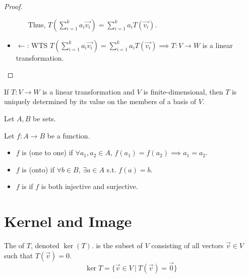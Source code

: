 \documentclass[11pt,fleqn]{book} %
\begin{document}
\begin{proof}
\begin{itemize}
\begin{itemize}
        Thus, $\displaystyle T(\sum_{i=1}^ka_i\overrightarrow{v_i})=\sum_{i=1}^ka_iT(\overrightarrow{v_i})$. 
        \end{itemize}
        
        \item $\leftarrow$: WTS $\displaystyle T(\sum_{i=1}^ka_i\overrightarrow{v_i})=\sum_{i=1}^ka_iT(\overrightarrow{v_i}) \implies T: V \to W$ is a linear transformation. 
    \end{itemize}
\end{proof}

\setcounter{dummy}{13}
\begin{proposition}
    If $T: V \to W$ is a linear transformation and $V$ is finite-dimensional, then $T$ is uniquely determined by its value on the members of a basis of $V$. 
\end{proposition}

\setcounter{section}{0}
\begin{definition}
    Let $A, B$ be sets. 

    Let $f: A \to B$ be a function. 

    \begin{itemize}
        \item $f$ is  (one to one) if $\forall a_1, a_2 \in A$, $f(a_1) = f(a_2) \implies a_1 = a_2$. 

        \item $f$ is  (onto) if $\forall b \in B$, $\exists a \in A$ s.t. $f(a) = b$. 

        \item $f$ is  if $f$ is both injective and surjective. 
    \end{itemize}
\end{definition}
\setcounter{section}{1}

\section{Kernel and Image}

\setcounter{section}{3}
\begin{definition}[Kernel]
    The  of $T$, denoted $\ker(T)$. is the subset of $V$ consisting of all vectors $\overrightarrow{v} \in V$ such that $T(\overrightarrow{v}) = 0$. $$\ker T=\{ \overrightarrow{v} \in V ~|~ T(\overrightarrow{v}) = \overrightarrow{0} \}$$
\end{definition}
\setcounter{section}{2}
\end{document}
